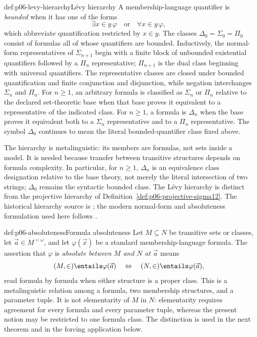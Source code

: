 \begin{hbdefinition}{def:p06-levy-hierarchy}{L\'evy hierarchy}
A membership-language quantifier is \emph{bounded} when it has one of the
forms
\[
  \exists x\in y\,\varphi
  \quad\text{or}\quad
  \forall x\in y\,\varphi,
\]
which abbreviate quantification restricted by \(x\in y\).  The classes
\(\Delta_0=\Sigma_0=\Pi_0\) consist of formulas all of whose quantifiers are
bounded.  Inductively, the normal-form representatives of
\(\Sigma_{n+1}\) begin with a finite block of unbounded existential
quantifiers followed by a \(\Pi_n\) representative; \(\Pi_{n+1}\) is the
dual class beginning with universal quantifiers.  The representative classes
are closed under bounded quantification and finite conjunction and
disjunction, while negation interchanges \(\Sigma_n\) and \(\Pi_n\).  For
\(n\geq1\), an arbitrary formula is classified as \(\Sigma_n\) or \(\Pi_n\)
relative to the declared set-theoretic base when that base proves it
equivalent to a representative of the indicated class.  For \(n\geq1\), a
formula is \(\Delta_n\) when the base proves it equivalent both to a \(\Sigma_n\)
representative and to a \(\Pi_n\) representative.  The symbol \(\Delta_0\)
continues to mean the literal bounded-quantifier class fixed above.

The hierarchy is metalinguistic: its members are formulas, not sets inside a
model.  It is needed because transfer between transitive structures depends
on formula complexity.  In particular, for \(n\geq1\), \(\Delta_n\) is an
equivalence class designation relative to the base theory, not merely the
literal intersection of two strings; \(\Delta_0\) remains the syntactic
bounded class.  The L\'evy hierarchy is distinct from the projective
hierarchy of Definition~\ref{def:p06-projective-sigma12}.
The historical hierarchy source is \cite{Levy1965}; the modern
normal-form and absoluteness formulation used here follows \cite{Jech2003}.
\end{hbdefinition}

\begin{hbconvention}{def:p06-absoluteness}{Formula absoluteness}
Let \(M\subseteq N\) be transitive sets or classes, let
\(\vec a\in M^{<\omega}\), and let \(\varphi(\vec x)\) be a standard
membership-language formula.  The assertion that \(\varphi\) is
\emph{absolute between \(M\) and \(N\) at \(\vec a\)} means
\[
  (M,\in)\entails\varphi(\vec a)
  \quad\Leftrightarrow\quad
  (N,\in)\entails\varphi(\vec a),
\]
read formula by formula when either structure is a proper class.  This is a
metalinguistic relation among a formula, two membership structures, and a
parameter tuple.  It is not elementarity of \(M\) in \(N\): elementarity
requires agreement for every formula and every parameter tuple, whereas the
present notion may be restricted to one formula class.  The distinction is
used in the next theorem and in the forcing application below.
\end{hbconvention}

